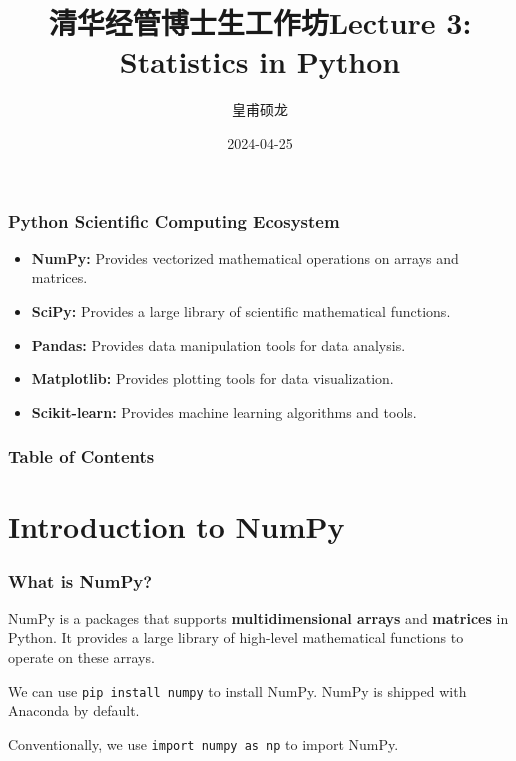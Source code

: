 \documentclass[beamer, en, version=2.0]{huangfusl-template}
\title[Lecture 3: Statistics in Python]{\LARGE{清华经管博士生工作坊}\newline\newline \large{Lecture 3: Statistics in Python}}
\author{皇甫硕龙}
\date{2024-04-25}
\begin{document}
    \begin{frame}
        \maketitle
    \end{frame}

    \begin{frame}
        \frametitle{Python Scientific Computing Ecosystem}

        \begin{itemize}
            \item \textbf{NumPy:} Provides vectorized mathematical operations on arrays and matrices.
            \item \textbf{SciPy:} Provides a large library of scientific mathematical functions.
            \item \textbf{Pandas:} Provides data manipulation tools for data analysis.
            \item \textbf{Matplotlib:} Provides plotting tools for data visualization.
            \item \textbf{Scikit-learn:} Provides machine learning algorithms and tools.
        \end{itemize}
    \end{frame}

    \begin{frame}
        \frametitle{Table of Contents}
        \tableofcontents[hideallsubsections]
    \end{frame}

    \section{Introduction to NumPy}

    \begin{frame}[fragile]
        \frametitle{What is NumPy?}

        NumPy is a packages that supports \textbf{multidimensional arrays} and \textbf{matrices} in Python. It provides a large library of high-level mathematical functions to operate on these arrays.

        We can use {\color{darkred}\footnotesize\verb|pip install numpy|} to install NumPy. NumPy is shipped with Anaconda by default.

        Conventionally, we use {\color{blue}\footnotesize\verb|import numpy as np|} to import NumPy.
    \end{frame}
\end{document}

